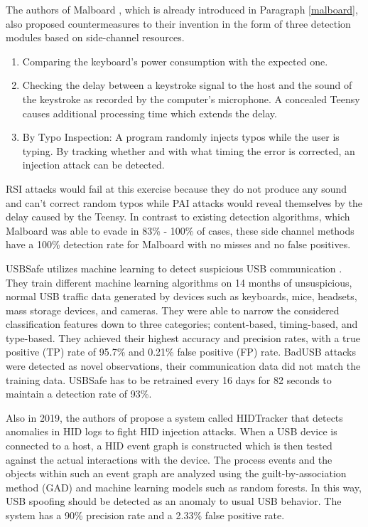 The authors of Malboard \cite{farhiMalboardNovelUser2019}, which is already introduced in Paragraph \ref{malboard}, also proposed countermeasures to their invention in the form of three detection modules based on side-channel resources. 
\begin{enumerate}
    \item Comparing the keyboard's power consumption with the expected one.
    \item Checking the delay between a keystroke signal to the host and the sound of the keystroke as recorded by the computer's microphone. A concealed Teensy causes additional processing time which extends the delay.
    \item By Typo Inspection: A program randomly injects typos while the user is typing. By tracking whether and with what timing the error is corrected, an injection attack can be detected.
\end{enumerate}
RSI attacks would fail at this exercise because they do not produce any sound and can't correct random typos while PAI attacks would reveal themselves by the delay caused by the Teensy.   
In contrast to existing detection algorithms, which Malboard was able to evade in 83\% - 100\% of cases, these side channel methods have a 100\%  detection rate for Malboard with no misses and no false positives.  

USBSafe utilizes machine learning to detect suspicious USB communication \cite{kharrazUSBESAFEEndPointSolution2019}. They train different machine learning algorithms on 14 months of unsuspicious, normal USB traffic data generated by devices such as keyboards, mice, headsets, mass storage devices, and cameras. They were able to narrow the considered classification features down to three categories; content-based, timing-based, and type-based. They achieved their highest accuracy and precision rates, with a true positive (TP) rate of 95.7\% and 0.21\% false positive (FP) rate. BadUSB attacks were detected as novel observations, their communication data did not match the training data.
USBSafe has to be retrained every 16 days for 82 seconds to maintain a detection rate of 93\%.

Also in 2019, the authors of \cite{IdentifyingHIDbasedAttacks2019} propose a system called HIDTracker that detects anomalies in HID logs to fight HID injection attacks. When a USB device is connected to a host, a HID event graph is constructed which is then tested against the actual interactions with the device. The process events and the objects within such an event graph are analyzed using the guilt-by-association method (GAD) and machine learning models such as random forests. In this way, USB spoofing should be detected as an anomaly to usual USB behavior. The system has a 90\% precision rate and a 2.33\% false positive rate. 


